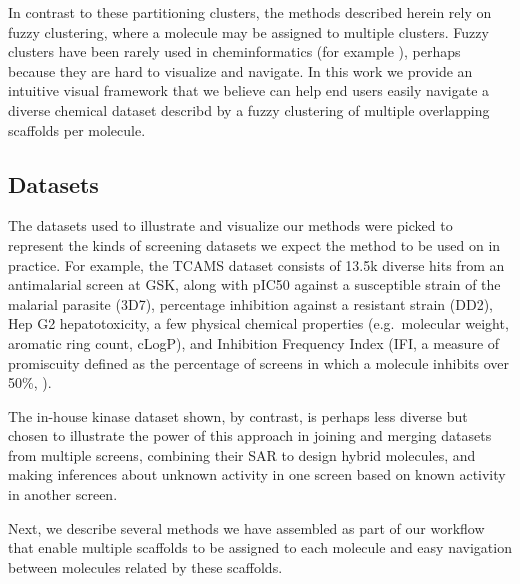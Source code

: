 \documentclass[journal=jacsat,manuscript=article]{achemso}
\newcommand*\tref[1]{Table~\ref{table:#1}}
\newcommand*\eg{e.g.~}
\begin{document}
In contrast to these partitioning clusters, the methods described
herein rely on fuzzy clustering, where a molecule may be assigned to
multiple clusters. Fuzzy clusters have been rarely used in
cheminformatics (for example \cite{Holliday2004,Richmond2015Galois}),
perhaps because they are hard to visualize and navigate.  In this work
we provide an intuitive visual framework that we believe can help end
users easily navigate a diverse chemical dataset describd by a fuzzy
clustering of multiple overlapping scaffolds per molecule.

\subsection{Datasets}
\label{sec:datasets}
The datasets used to illustrate and visualize our methods were picked
to represent the kinds of screening datasets we expect the method to
be used on in practice. For example, the TCAMS dataset\cite{Gamo2010}
consists of 13.5k diverse hits from an antimalarial screen at GSK,
along with pIC50 against a susceptible strain of the malarial parasite
(3D7), percentage inhibition against a resistant strain (DD2), Hep G2
hepatotoxicity, a few physical chemical properties (\eg molecular
weight, aromatic ring count, cLogP), and Inhibition Frequency Index
(IFI, a measure of promiscuity defined as the percentage of screens in
which a molecule inhibits over 50\%, \cite{Chakravorty2013IFI}).

The in-house kinase dataset shown, by contrast, is perhaps less
diverse but chosen to illustrate the power of this approach in joining
and merging datasets from multiple screens, combining their SAR to
design hybrid molecules, and making inferences about unknown activity
in one screen based on known activity in another screen.


Next, we describe several methods we have assembled as part of our
workflow that enable multiple scaffolds to be assigned to each
molecule and easy navigation between molecules related by these
scaffolds.


\end{document}
